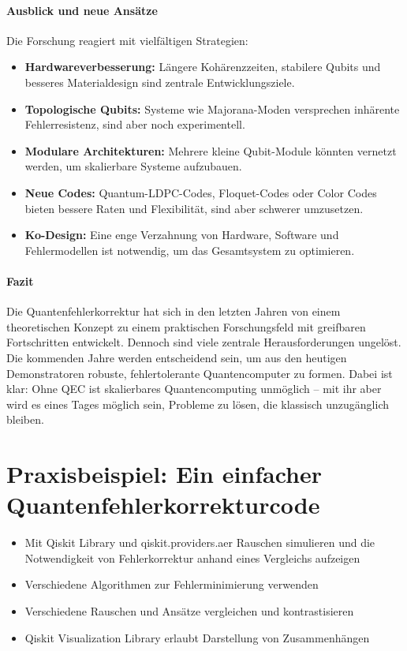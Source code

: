 \paragraph{Ausblick und neue Ans\"atze}
Die Forschung reagiert mit vielf\"altigen Strategien:
\begin{itemize}
    \item \textbf{Hardwareverbesserung:} Längere Kohärenzzeiten, stabilere Qubits und besseres Materialdesign sind zentrale Entwicklungsziele.
    \item \textbf{Topologische Qubits:} Systeme wie Majorana-Moden versprechen inhärente Fehlerresistenz, sind aber noch experimentell.
    \item \textbf{Modulare Architekturen:} Mehrere kleine Qubit-Module könnten vernetzt werden, um skalierbare Systeme aufzubauen.
    \item \textbf{Neue Codes:} Quantum-LDPC-Codes, Floquet-Codes oder Color Codes bieten bessere Raten und Flexibilität, sind aber schwerer umzusetzen.
    \item \textbf{Ko-Design:} Eine enge Verzahnung von Hardware, Software und Fehlermodellen ist notwendig, um das Gesamtsystem zu optimieren.
\end{itemize}

\paragraph{Fazit} 
Die Quantenfehlerkorrektur hat sich in den letzten Jahren von einem theoretischen Konzept zu einem praktischen Forschungsfeld mit greifbaren Fortschritten entwickelt. Dennoch sind viele zentrale Herausforderungen ungel\"ost. Die kommenden Jahre werden entscheidend sein, um aus den heutigen Demonstratoren robuste, fehlertolerante Quantencomputer zu formen. Dabei ist klar: Ohne QEC ist skalierbares Quantencomputing unm\"oglich -- mit ihr aber wird es eines Tages m\"oglich sein, Probleme zu l\"osen, die klassisch unzug\"anglich bleiben.


\section{Praxisbeispiel: Ein einfacher Quantenfehlerkorrekturcode}
\begin{itemize}
    \item Mit Qiskit Library und qiskit.providers.aer Rauschen simulieren und die Notwendigkeit von Fehlerkorrektur anhand eines Vergleichs aufzeigen
    \item Verschiedene Algorithmen zur Fehlerminimierung verwenden
    \item Verschiedene Rauschen und Ansätze vergleichen und kontrastisieren
    \item Qiskit Visualization Library erlaubt Darstellung von Zusammenhängen
\end{itemize}



\printbibliography
